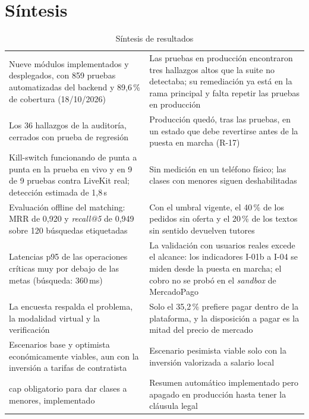 \section{Síntesis}

\begin{table}[H]
    \centering
    \caption{Síntesis de resultados}
    \label{tab:sintesis-resultados}
    \small
    \begin{tabularx}{\textwidth}{L L}
        \toprule
         &  \\
        \midrule
        Nueve módulos implementados y desplegados, con 859 pruebas automatizadas del backend y 89,6\,\% de cobertura (18/10/2026) &
        Las pruebas en producción encontraron tres hallazgos altos que la suite no detectaba; su remediación ya está en la rama principal y falta repetir las pruebas en producción \\
        Los 36 hallazgos de la auditoría, cerrados con prueba de regresión &
        Producción quedó, tras las pruebas, en un estado que debe revertirse antes de la puesta en marcha (R-17) \\
        Kill-switch funcionando de punta a punta en la prueba en vivo y en 9 de 9 pruebas contra LiveKit real; detección estimada de 1,8\,s &
        Sin medición en un teléfono físico; las clases con menores siguen deshabilitadas \\
        Evaluación offline del \gls{matching}: MRR de 0,920 y \emph{recall@5} de 0,949 sobre 120 búsquedas etiquetadas &
        Con el umbral vigente, el 40\,\% de los pedidos sin oferta y el 20\,\% de los textos sin sentido devuelven tutores \\
        Latencias p95 de las operaciones críticas muy por debajo de las metas (búsqueda: 360\,ms) &
        La validación con usuarios reales excede el alcance: los indicadores I-01b a I-04 se miden desde la puesta en marcha; el cobro no se probó en el \emph{sandbox} de MercadoPago \\
        La encuesta respalda el problema, la modalidad virtual y la verificación &
        Solo el 35,2\,\% prefiere pagar dentro de la plataforma, y la disposición a pagar es la mitad del precio de mercado \\
        Escenarios base y optimista económicamente viables, aun con la inversión a tarifas de contratista &
        Escenario pesimista viable solo con la inversión valorizada a salario local \\
        \gls{cap} obligatorio para dar clases a menores, implementado &
        Resumen automático implementado pero apagado en producción hasta tener la cláusula legal \\
        \bottomrule
    \end{tabularx}
\end{table}

